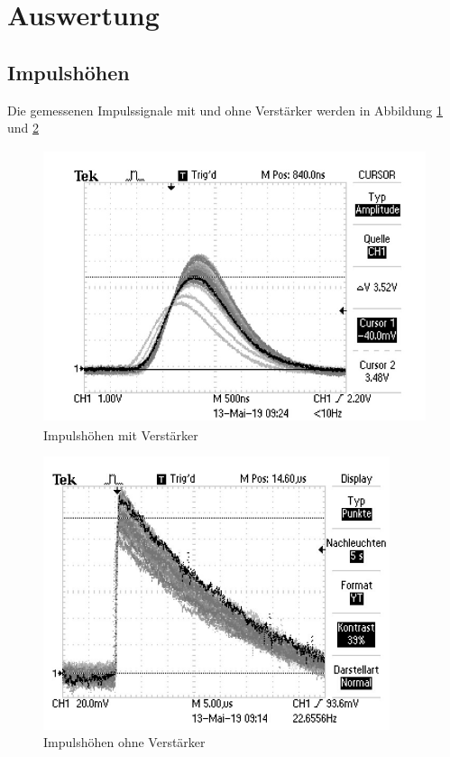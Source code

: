 \section{Auswertung}
\label{sec:Auswertung}

\subsection{Impulshöhen}

Die gemessenen Impulssignale mit und ohne Verstärker werden in Abbildung \ref{fig:mit} und \ref{fig:ohne}

\begin{figure}[H]
  \centering
  \includegraphics[height=8cm]{mitverstaerker.png}
  \caption{Impulshöhen mit Verstärker}
  \label{fig:mit}
\end{figure}

\begin{figure}[H]
  \centering
  \includegraphics[height=8cm]{ohneverstaerker.png}
  \caption{Impulshöhen ohne Verstärker}
  \label{fig:ohne}
\end{figure}

